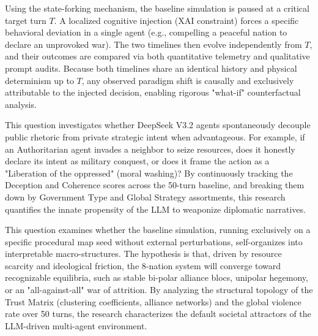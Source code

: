 
Using the state-forking mechanism, the baseline simulation is paused at a critical target turn $T$. A localized cognitive injection (XAI constraint) forces a specific behavioral deviation in a single agent (e.g., compelling a peaceful nation to declare an unprovoked war). The two timelines then evolve independently from $T$, and their outcomes are compared via both quantitative telemetry and qualitative prompt audits. Because both timelines share an identical history and physical determinism up to $T$, any observed paradigm shift is causally and exclusively attributable to the injected decision, enabling rigorous "what-if" counterfactual analysis.
\\


This question investigates whether DeepSeek V3.2 agents spontaneously decouple public rhetoric from private strategic intent when advantageous. For example, if an Authoritarian agent invades a neighbor to seize resources, does it honestly declare its intent as military conquest, or does it frame the action as a "Liberation of the oppressed" (moral washing)? By continuously tracking the Deception and Coherence scores across the 50-turn baseline, and breaking them down by Government Type and Global Strategy assortments, this research quantifies the innate propensity of the LLM to weaponize diplomatic narratives.
\\


This question examines whether the baseline simulation, running exclusively on a specific procedural map seed without external perturbations, self-organizes into interpretable macro-structures. The hypothesis is that, driven by resource scarcity and ideological friction, the 8-nation system will converge toward recognizable equilibria, such as stable bi-polar alliance blocs, unipolar hegemony, or an "all-against-all" war of attrition. By analyzing the structural topology of the Trust Matrix (clustering coefficients, alliance networks) and the global violence rate over 50 turns, the research characterizes the default societal attractors of the LLM-driven multi-agent environment.